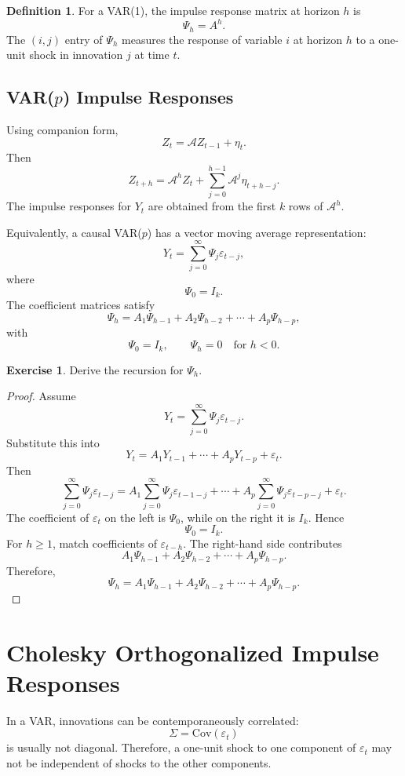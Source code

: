 \documentclass[12pt,oneside]{book}
\numberwithin{equation}{section}
\theoremstyle{definition}
\newtheorem{definition}{Definition}[section]
\newtheorem{exercise}{Exercise}[section]
\theoremstyle{plain}
\theoremstyle{remark}
\newcommand{\Cov}{\mathrm{Cov}}
\begin{document}
\begin{definition}
For a VAR(1), the impulse response matrix at horizon $h$ is
\[
\Psi_h=A^h.
\]
The $(i,j)$ entry of $\Psi_h$ measures the response of variable $i$ at horizon $h$ to a one-unit shock in innovation $j$ at time $t$.
\end{definition}

\subsection{VAR($p$) Impulse Responses}

Using companion form,
\[
Z_t=\mathcal{A}Z_{t-1}+\eta_t.
\]
Then
\[
Z_{t+h}
=
\mathcal{A}^hZ_t
+
\sum_{j=0}^{h-1}\mathcal{A}^j\eta_{t+h-j}.
\]
The impulse responses for $Y_t$ are obtained from the first $k$ rows of $\mathcal{A}^h$.

Equivalently, a causal VAR($p$) has a vector moving average representation:
\[
Y_t
=
\sum_{j=0}^{\infty}\Psi_j\varepsilon_{t-j},
\]
where
\[
\Psi_0=I_k.
\]
The coefficient matrices satisfy
\[
\Psi_h
=
A_1\Psi_{h-1}
+
A_2\Psi_{h-2}
+\cdots+
A_p\Psi_{h-p},
\]
with
\[
\Psi_0=I_k,
\qquad
\Psi_h=0
\quad
\text{for } h<0.
\]

\begin{exercise}
Derive the recursion for $\Psi_h$.
\end{exercise}

\begin{proof}
Assume
\[
Y_t=\sum_{j=0}^{\infty}\Psi_j\varepsilon_{t-j}.
\]
Substitute this into
\[
Y_t=A_1Y_{t-1}+\cdots+A_pY_{t-p}+\varepsilon_t.
\]
Then
\[
\sum_{j=0}^{\infty}\Psi_j\varepsilon_{t-j}
=
A_1\sum_{j=0}^{\infty}\Psi_j\varepsilon_{t-1-j}
+\cdots+
A_p\sum_{j=0}^{\infty}\Psi_j\varepsilon_{t-p-j}
+\varepsilon_t.
\]
The coefficient of $\varepsilon_t$ on the left is $\Psi_0$, while on the right it is $I_k$. Hence
\[
\Psi_0=I_k.
\]
For $h\geq 1$, match coefficients of $\varepsilon_{t-h}$. The right-hand side contributes
\[
A_1\Psi_{h-1}+A_2\Psi_{h-2}+\cdots+A_p\Psi_{h-p}.
\]
Therefore,
\[
\Psi_h
=
A_1\Psi_{h-1}
+
A_2\Psi_{h-2}
+\cdots+
A_p\Psi_{h-p}.
\]
\end{proof}

\section{Cholesky Orthogonalized Impulse Responses}

In a VAR, innovations can be contemporaneously correlated:
\[
\Sigma=
\Cov(\varepsilon_t)
\]
is usually not diagonal. Therefore, a one-unit shock to one component of $\varepsilon_t$ may not be independent of shocks to the other components.
\end{document}
